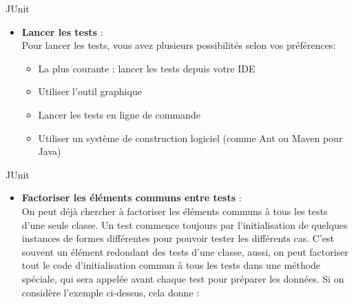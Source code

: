 \documentclass{beamer}
\begin{document}
    \begin{frame}{JUnit}   
    \begin{itemize}
    \item{\bfseries Lancer les tests} :\\
       Pour lancer les tests, vous avez plusieurs possibilités selon vos préférences:
       \begin{itemize}
      
        \item{La plus courante : lancer les tests depuis votre IDE}
        \item{Utiliser l'outil graphique}
        \item{Lancer les tests en ligne de commande}
        \item{Utiliser un système de construction logiciel (comme Ant ou Maven pour Java)}
        \end{itemize}
        \end{itemize}
    \end{frame}
        
         \begin{frame}{JUnit}   
         \begin{itemize}
        \item{{\bfseries Factoriser les éléments communs entre tests} :\\
        On peut déjà chercher à factoriser les éléments communs à tous les tests d'une seule classe. Un test commence toujours par l'initialisation de quelques instances de formes différentes pour pouvoir tester les différents cas. C'est souvent un élément redondant des tests d'une classe, aussi, on peut factoriser tout le code d'initialisation commun à tous les tests dans une méthode spéciale, qui sera appelée avant chaque test pour préparer les données.
        Si on considère l'exemple ci-dessus, cela donne :}
        
         \end{itemize}
         \end{frame}
            
         \begin{frame}[allowframebreaks]
         \begin{small}
         \lstset{small}
        
        
        \end{small}
        \end{frame}
       
\end{document}
